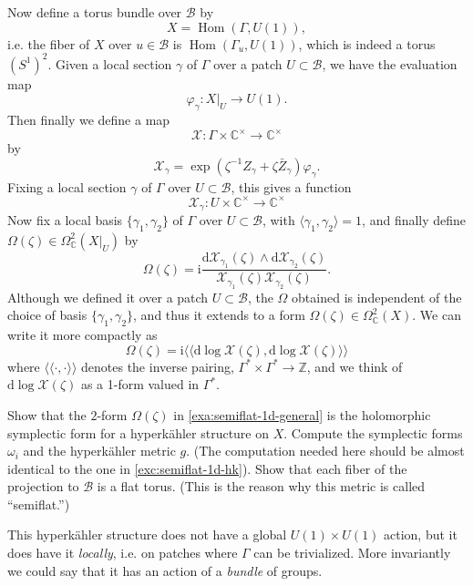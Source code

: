 \documentclass[12pt,letterpaper,reqno]{article}
\numberwithin{equation}{section}
\newcommand{\cB}{\ensuremath{\mathcal B}}
\newcommand{\cX}{\ensuremath{\mathcal X}}
\newcommand{\C}{\ensuremath{\mathbb C}}
\newcommand{\Z}{\ensuremath{\mathbb Z}}
\newcommand{\hk}{hyperk\"ahler\xspace}
\newcommand{\I}{{\mathrm i}}
\newcommand{\de}{\mathrm{d}}
\newcommand{\IP}[1]{\langle#1\rangle}
\newcommand{\DIP}[1]{\langle\!\langle#1\rangle\!\rangle}
\newcommand{\ti}[1]{\textit{#1}}
\DeclareMathOperator{\Hom}{Hom}
\begin{document}
\begin{example}
Now define a torus bundle over $\cB$ by
\begin{equation}
  X = \Hom(\Gamma, U(1)),
\end{equation}
i.e. the fiber of $X$ over $u \in \cB$ is $\Hom(\Gamma_{u}, U(1))$,
which is indeed a torus $(S^1)^2$.
Given a local section $\gamma$ of $\Gamma$ over a patch
$U \subset \cB$, we have the evaluation map
\begin{equation}
  \varphi_\gamma: X \vert_U \to U(1).
\end{equation}
Then finally we define a map
\begin{equation}
  \cX: \Gamma \times \C^\times \to \C^\times
\end{equation}
by
\begin{equation}
  \cX_\gamma = \exp \left(\zeta^{-1} Z_\gamma + \zeta\bar{Z}_\gamma \right) \varphi_\gamma.
\end{equation}
Fixing a local section $\gamma$ of $\Gamma$ over $U \subset \cB$,
this gives a function
\begin{equation}
  \cX_\gamma: U \times \C^\times \to \C^\times
\end{equation}
Now fix a local basis $\{\gamma_1, \gamma_2\}$ of $\Gamma$
over $U \subset \cB$, with $\IP{\gamma_1,\gamma_2} = 1$,
and finally define $\Omega(\zeta) \in \Omega^2_\C(X\vert_U)$
by
\begin{equation}
  \Omega(\zeta) = \I \frac{\de \cX_{\gamma_1}(\zeta) \wedge \de \cX_{\gamma_2}(\zeta)}{\cX_{\gamma_1}(\zeta) \cX_{\gamma_2}(\zeta)}.
\end{equation}
Although we defined it over a patch $U \subset \cB$,
the $\Omega$ obtained is independent of the choice of
basis $\{\gamma_1,\gamma_2\}$, and thus it extends to a form
$\Omega(\zeta) \in \Omega^2_\C(X)$.
We can write it more compactly as
\begin{equation}
  \Omega(\zeta) = \I \DIP{\de \log \cX(\zeta), \de \log \cX(\zeta)}
\end{equation}
where $\DIP{\cdot,\cdot}$ denotes the inverse pairing,
$\Gamma^* \times \Gamma^* \to \Z$, and we think of
$\de \log \cX(\zeta)$ as a 1-form valued in $\Gamma^*$.
\end{example}

\begin{exercise} Show that the $2$-form $\Omega(\zeta)$ in
\autoref{exa:semiflat-1d-general} is the holomorphic symplectic
form for a \hk structure on $X$. Compute the symplectic forms
$\omega_i$ and the \hk metric $g$.
(The computation needed here should be almost
identical to the one in \autoref{exc:semiflat-1d-hk}).
Show that each fiber of the
projection to $\cB$ is a flat torus. (This is the reason why
this metric is called ``semiflat.'')
\end{exercise}
This \hk structure does
not have a global $U(1) \times U(1)$ action, but it does have
it \ti{locally}, i.e. on patches where $\Gamma$ can be trivialized. More invariantly we could say that
it has an action of a \ti{bundle} of groups.
\end{document}
